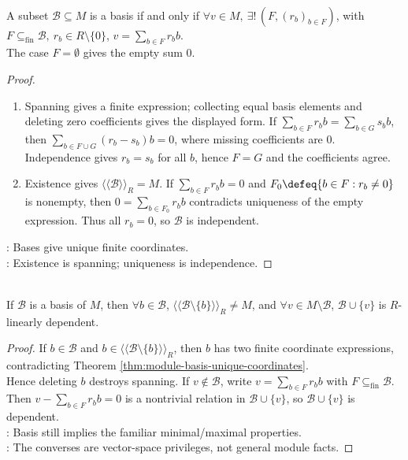 \begin{theorem} \label{thm:module-basis-unique-coordinates} \\
A subset $\mathcal{B}\subseteq M$ is a basis if and only if $\forall v\in M,\ \exists!\,(F,(r_b)_{b\in F})$, with $F\subseteq_{\operatorname{fin}}\mathcal{B},\ r_b\in R\setminus\{0\}$, $v=\sum\limits_{b\in F}r_bb$.\\
The case $F=\emptyset$ gives the empty sum $0$.
\begin{proof}
\begin{enumerate}[label=\roman*.]
\setlength{\itemsep}{0pt}
\item[$(\Rightarrow)$] Spanning gives a finite expression; collecting equal basis elements and deleting zero coefficients gives the displayed form. If $\sum\limits_{b\in F}r_bb=\sum\limits_{b\in G}s_bb$, then $\sum\limits_{b\in F\cup G}(r_b-s_b)b=0$, where missing coefficients are $0$.\\
Independence gives $r_b=s_b$ for all $b$, hence $F=G$ and the coefficients agree.
\item[$(\Leftarrow)$] Existence gives $\langle\!\langle\mathcal{B}\rangle\!\rangle_R=M$. If $\sum\limits_{b\in F}r_bb=0$ and $F_0\defeq\{b\in F:r_b\neq0\}$ is nonempty, then $0=\sum\limits_{b\in F_0}r_bb$ contradicts uniqueness of the empty expression. Thus all $r_b=0$, so $\mathcal{B}$ is independent.
\end{enumerate}
: Bases give unique finite coordinates.\\
: Existence is spanning; uniqueness is independence.
\end{proof}
\end{theorem}

\begin{proposition} \label{prop:module-basis-minimal-maximal} \\
If $\mathcal{B}$ is a basis of $M$, then $\forall b\in\mathcal{B}$, $\langle\!\langle\mathcal{B}\setminus\{b\}\rangle\!\rangle_R\neq M$, and $\forall v\in M\setminus\mathcal{B}$, $\mathcal{B}\cup\{v\}$ is $R$-linearly dependent.
\begin{proof}
If $b\in\mathcal{B}$ and $b\in\langle\!\langle\mathcal{B}\setminus\{b\}\rangle\!\rangle_R$, then $b$ has two finite coordinate expressions, contradicting Theorem \ref{thm:module-basis-unique-coordinates}.\\
Hence deleting $b$ destroys spanning. If $v\notin\mathcal{B}$, write $v=\sum_{b\in F}r_bb$ with $F\subseteq_{\operatorname{fin}}\mathcal{B}$.\\
Then $v-\sum\limits_{b\in F}r_bb=0$ is a nontrivial relation in $\mathcal{B}\cup\{v\}$, so $\mathcal{B}\cup\{v\}$ is dependent.\\
: Basis still implies the familiar minimal/maximal properties.\\
: The converses are vector-space privileges, not general module facts.
\end{proof}
\end{proposition}


